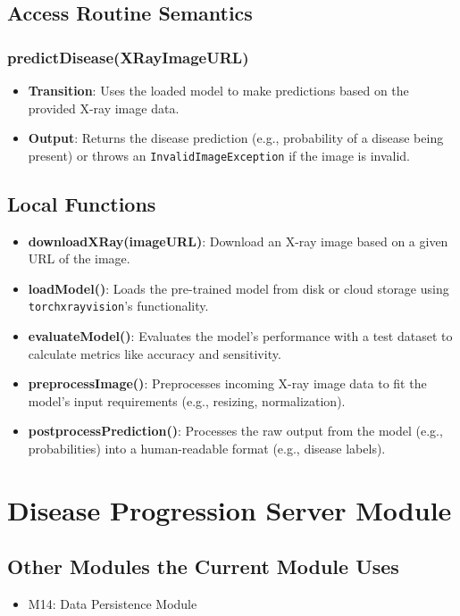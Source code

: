 \documentclass[12pt, titlepage]{article}
\begin{document}
\subsection{Access Routine Semantics}
\subsubsection{predictDisease(XRayImageURL)}
\begin{itemize}
    \item \textbf{Transition}: Uses the loaded model to make predictions based on the provided X-ray image data.
    \item \textbf{Output}: Returns the disease prediction (e.g., probability of a disease being present) or throws an \texttt{InvalidImageException} if the image is invalid.
\end{itemize}

\subsection{Local Functions}
\begin{itemize}
    \item \textbf{downloadXRay(imageURL)}: Download an X-ray image based on a given URL of the image.
    \item \textbf{loadModel()}: Loads the pre-trained model from disk or cloud storage using \texttt{torchxrayvision}'s functionality.
    \item \textbf{evaluateModel()}: Evaluates the model’s performance with a test dataset to calculate metrics like accuracy and sensitivity.
    \item \textbf{preprocessImage()}: Preprocesses incoming X-ray image data to fit the model's input requirements (e.g., resizing, normalization).
    \item \textbf{postprocessPrediction()}: Processes the raw output from the model (e.g., probabilities) into a human-readable format (e.g., disease labels).
\end{itemize}



\section{Disease Progression Server Module}

\subsection{Other Modules the Current Module Uses}
\begin{itemize}
    \item M14: Data Persistence Module
\end{itemize}
\end{document}
